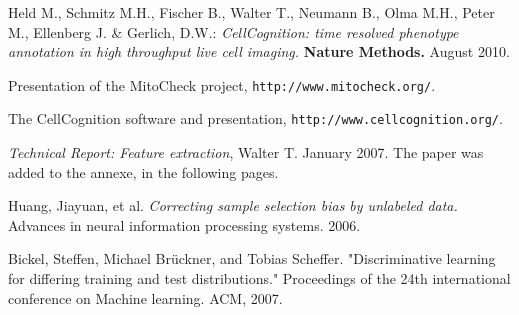 \documentclass{article}
\begin{document}
\begin{thebibliography}{9}

 Held M., Schmitz M.H., Fischer B., Walter T., Neumann B., Olma M.H., Peter M., Ellenberg J. \& 
Gerlich, D.W.: \textit{CellCognition: time resolved phenotype annotation in high throughput live cell imaging.} \textbf{Nature Methods.} August 2010.


 Presentation of the MitoCheck project, \texttt{http://www.mitocheck.org/}.


 The CellCognition software and presentation, \texttt{http://www.cellcognition.org/}.


 \textit{Technical Report: Feature extraction}, Walter T. January 2007. The paper was added to the annexe, in the following pages.

 Huang, Jiayuan, et al. \textit{Correcting sample selection bias by unlabeled data.} Advances in neural information processing systems. 2006.

 Bickel, Steffen, Michael Brückner, and Tobias Scheffer. "Discriminative learning for differing training and test distributions." Proceedings of the 24th international conference on Machine learning. ACM, 2007.
\end{thebibliography}



\end{document}
